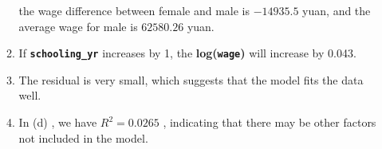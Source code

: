 \documentclass{article}
\begin{document}
\begin{enumerate}
\begin{enumerate}
        the wage difference between female and male is $-14935.5$ yuan, 
        and the average wage for male is $62580.26$ yuan.
        \item \begin{stlog}
            
        \end{stlog} \par
        If \textbf{\texttt{schooling\_yr}} increases by 1, the \textbf{log(\texttt{wage})} will increase by 0.043.
        \item \begin{stlog}
            
        \end{stlog} \par
        The residual is very small, which suggests that the model fits the data well.
        \item In (d) , we have $R^2=0.0265$ , indicating that there may be other factors not included in the model.
    \end{enumerate}
\end{enumerate}
\end{document}
